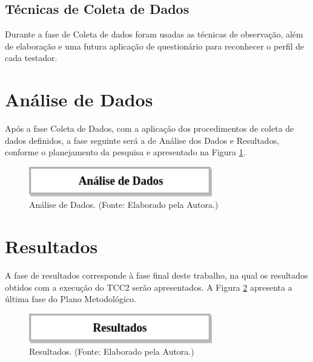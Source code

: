 \subsection{Técnicas de Coleta de Dados}

Durante a fase de Coleta de dados foram usadas as técnicas de observação, além de elaboração e uma futura aplicação de questionário para reconhecer o perfil de cada testador.

\section{Análise de Dados}

Após a fase Coleta de Dados, com a aplicação dos procedimentos de coleta de dados definidos, a fase seguinte será a de Análise dos Dados e Resultados, conforme o planejamento da pesquisa e apresentado na Figura \ref{fig:analiseDados}.

        \begin{figure}[H]
          \centering
          \includegraphics[width=8cm]{figuras/analiseDados.png}
          \caption{Análise de Dados. (Fonte: Elaborado pela Autora.)}
          \label{fig:analiseDados}

        \end{figure}

\section{Resultados}

A fase de resultados corresponde à fase final deste trabalho, na qual os resultados obtidos com a execução do TCC2 serão apresentados. A Figura \ref{fig:resultados} apresenta a última fase do Plano Metodológico.

        \begin{figure}[H]
          \centering
          \includegraphics[width=8cm]{figuras/resultados.png}
          \caption{Resultados. (Fonte: Elaborado pela Autora.)}
          \label{fig:resultados}

        \end{figure}


